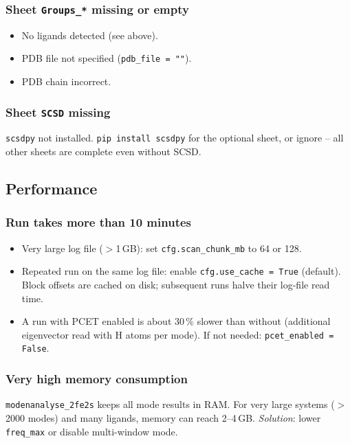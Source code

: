 \documentclass[11pt,a4paper,twoside]{article}
\theoremstyle{remark}
\begin{document}
\subsubsection*{Sheet \texttt{Groups\_*} missing or empty}

\begin{itemize}
  \item No ligands detected (see above).
  \item PDB file not specified (\texttt{pdb\_file = ""}).
  \item PDB chain incorrect.
\end{itemize}

\subsubsection*{Sheet \texttt{SCSD} missing}

\texttt{scsdpy} not installed. \texttt{pip install scsdpy} for the
optional sheet, or ignore -- all other sheets are complete even
without SCSD.

\subsection{Performance}

\subsubsection*{Run takes more than 10 minutes}

\begin{itemize}
  \item Very large log file ($>$1\,GB): set
        \texttt{cfg.scan\_chunk\_mb} to 64 or 128.
  \item Repeated run on the same log file: enable
        \texttt{cfg.use\_cache = True} (default). Block offsets
        are cached on disk; subsequent runs halve their log-file
        read time.
  \item A run with PCET enabled is about 30\,\% slower than
        without (additional eigenvector read with H atoms per
        mode). If not needed: \texttt{pcet\_enabled = False}.
\end{itemize}

\subsubsection*{Very high memory consumption}

\texttt{modenanalyse\_2fe2s} keeps all mode results in RAM. For
very large systems ($>$2000 modes) and many ligands, memory can
reach 2--4\,GB. \emph{Solution}: lower \texttt{freq\_max} or
disable multi-window mode.
\end{document}
